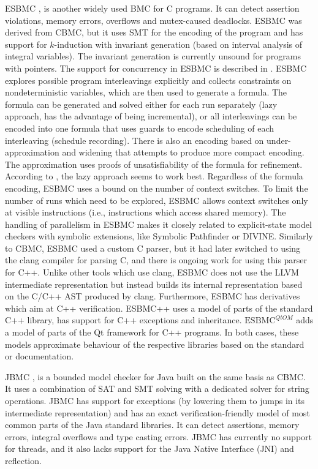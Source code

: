 ESBMC , is another widely used BMC for C
programs.
It can detect assertion violations, memory errors, overflows and mutex-caused
deadlocks.
ESBMC was derived from CBMC, but it uses SMT for the encoding of the program and has
support for $k$-induction with invariant generation (based on interval analysis
of integral variables).
The invariant generation is currently unsound for programs with pointers.
The support for concurrency in ESBMC is described in .
ESBMC explores possible program interleavings explicitly and
collects constraints on nondeterministic variables, which are then
used to generate a formula.
The formula can be generated and solved either for each run separately (lazy
approach, has the advantage of being incremental), or all interleavings can be
encoded into one formula that uses guards to encode scheduling of each
interleaving (schedule recording).
There is also an encoding based on under-approximation and widening that
attempts to produce more compact encoding.
The approximation uses proofs of unsatisfiability of the formula for refinement.
According to , the lazy approach seems to work best. 
Regardless of the formula encoding, ESBMC uses a bound on the number of context
switches.
To limit the number of runs which need to be explored, ESBMC allows
context switches only at visible instructions (i.e., instructions which access
shared memory).
The handling of parallelism in ESBMC makes it closely related to explicit-state
model checkers with symbolic extensions, like Symbolic Pathfinder or DIVINE.
Similarly to CBMC, ESBMC used a custom C parser, but it had later switched to
using the clang compiler for parsing C, and there is ongoing work for using this
parser for C++.
Unlike other tools which use clang, ESBMC does not use the LLVM intermediate
representation but instead builds its internal representation based on the
C/C++ AST produced by clang.
Furthermore, ESBMC has derivatives which aim at C++ verification.
ESBMC++  uses a model of parts of the standard C++ library,
has support for C++ exceptions and inheritance.
$\text{ESBMC}^{\textit{Qt}OM}$  adds a model
of parts of the Qt framework for C++ programs.
In both cases, these models approximate behaviour of the respective libraries
based on the standard or documentation.

JBMC , is a bounded model checker for
Java built on the same basis as CBMC.
It uses a combination of SAT and SMT solving with a dedicated solver for string
operations.
JBMC has support for exceptions (by lowering them to jumps in its intermediate
representation) and has an exact verification-friendly model of most common
parts of the Java standard libraries.
It can detect assertions, memory errors, integral overflows and type casting
errors.
JBMC has currently no support for threads, and it also lacks support for the
Java Native Interface (JNI) and reflection.

